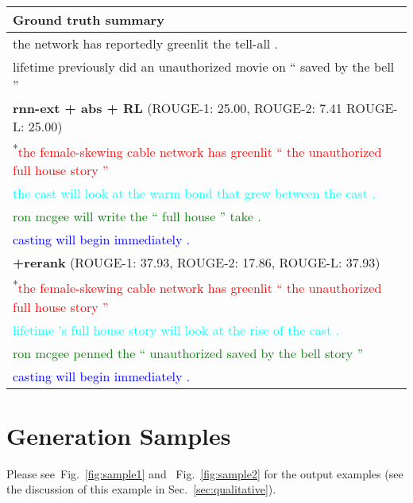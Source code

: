 \documentclass[11pt,a4paper]{article}
\def\figref#1{Fig.~\ref{#1}}
\def\secref#1{Sec.~\ref{#1}}
\begin{document}
\begin{figure*}[t]
\begin{tabular*}{\textwidth}{| p{} | }
  \\ \hline
  \textbf{Ground truth summary} \\ \hline
          the network has reportedly greenlit the tell-all . \\
        lifetime previously did an unauthorized movie on `` saved by the bell '' \\
  \hline
  \textbf{rnn-ext + abs + RL} (ROUGE-1: 25.00, ROUGE-2: 7.41 ROUGE-L: 25.00)\\ \hline
  \textsuperscript{*}\textcolor{red}{the female-skewing cable network has greenlit `` the unauthorized full house story ''} \\
\textsuperscript{}\textcolor{cyan}{the cast will look at the warm bond that grew between the cast .} \\
\textsuperscript{}\textcolor{green}{ron mcgee will write the `` full house '' take .} \\
\textsuperscript{}\textcolor{blue}{casting will begin immediately .} \\ \hline
  \textbf{+rerank} (ROUGE-1: 37.93, ROUGE-2: 17.86, ROUGE-L: 37.93)\\ \hline
  \textsuperscript{*}\textcolor{red}{the female-skewing cable network has greenlit `` the unauthorized full house story ''} \\
\textsuperscript{}\textcolor{cyan}{lifetime 's full house story will look at the rise of the cast .} \\
\textsuperscript{}\textcolor{green}{ron mcgee penned the `` unauthorized saved by the bell story ''} \\
\textsuperscript{}\textcolor{blue}{casting will begin immediately .} \\
  \hline
\end{tabular*}
\caption{
Example from the dataset showing the generated summary of our best models. 
The colored (marked) sentences correspond to our extractor's sentence selection.
The listed ROUGE scores are computed for this specific example.
}
\label{fig:sample2}
\end{figure*} 
\section{Generation Samples}
\label{sec:samples}
Please see~\figref{fig:sample1}  and ~\figref{fig:sample2} for the output examples (see the discussion of this example in \secref{sec:qualitative}).
\clearpage

 
\end{document}
